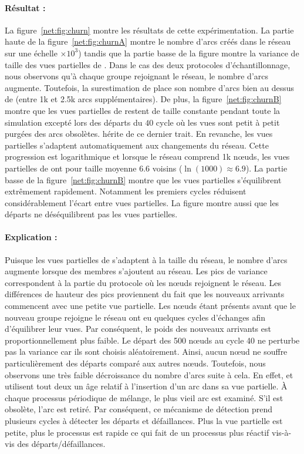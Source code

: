 \paragraph{Résultat :} La figure~\ref{net:fig:churn} montre les résultats de
cette expérimentation. La partie haute de la figure~\ref{net:fig:churnA} montre
le nombre d'arcs créés dans le réseau sur une échelle $\times 10^3$) tandis que
la partie basse de la figure montre la variance de taille des vues partielles de
\SPRAY. Dans le cas des deux protocoles d'échantillonnage, nous observons qu'à
chaque groupe rejoignant le réseau, le nombre d'arcs augmente. Toutefois, la
surestimation de \CYCLON place son nombre d'arcs bien au dessus de \SPRAY (entre
1k et 2.5k arcs supplémentaires). De plus, la figure~\ref{net:fig:churnB} montre
que les vues partielles de \CYCLON restent de taille constante pendant toute la
simulation excepté lors des départs du $40$ cycle où les vues sont petit
à petit purgées des arcs obsolètes. \SPRAY hérite de ce dernier trait. En
revanche, les vues partielles s'adaptent automatiquement aux changements du
réseau. Cette progression est logarithmique et lorsque le réseau comprend 1k
nœuds, les vues partielles de \SPRAY ont pour taille moyenne 6.6 voisins
($\ln(1000)\approx6.9$). La partie basse de la figure~\ref{net:fig:churnB}
montre que les vues partielles s'équilibrent extrêmement rapidement. Notamment
les premiers cycles réduisent considérablement l'écart entre vues partielles. La
figure montre aussi que les départs ne déséquilibrent pas les vues partielles.

\paragraph{Explication :} Puisque les vues partielles de \SPRAY s'adaptent à la
taille du réseau, le nombre d'arcs augmente lorsque des membres s'ajoutent
au réseau. Les pics de variance correspondent à la partie du protocole où les
nœuds rejoignent le réseau. Les différences de hauteur des pics proviennent du
fait que les nouveaux arrivants commencent avec une petite vue partielle. Les
nœuds étant présents avant que le nouveau groupe rejoigne le réseau ont eu
quelques cycles d'échanges afin d'équilibrer leur vues. Par conséquent, le poids
des nouveaux arrivants est proportionnellement plus faible. Le départ des 500
nœuds au cycle 40 ne perturbe pas la variance car ils sont choisis
aléatoirement. Ainsi, aucun nœud ne souffre particulièrement des départs comparé
aux autres nœuds. Toutefois, nous observons une très faible décroissance du
nombre d'arcs suite à cela. En effet, \CYCLON et \SPRAY utilisent tout deux un
âge relatif à l'insertion d'un arc dans sa vue partielle. À chaque processus
périodique de mélange, le plus vieil arc est examiné. S'il est obsolète, l'arc
est retiré. Par conséquent, ce mécanisme de détection prend plusieurs cycles à
détecter les départs et défaillances. Plus la vue partielle est petite, plus le
processus est rapide ce qui fait de \SPRAY un processus plus réactif vis-à-vis
des départs/défaillances.

